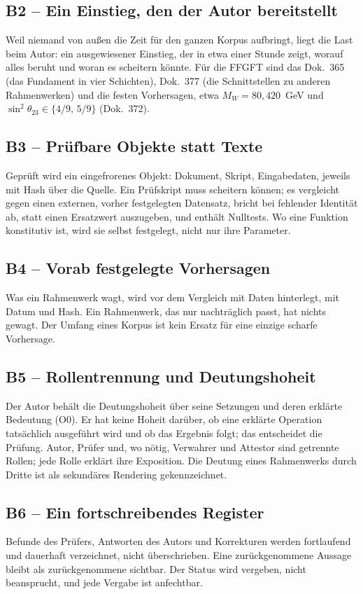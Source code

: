 \subsection*{B2 -- Ein Einstieg, den der Autor bereitstellt}
Weil niemand von außen die Zeit für den ganzen Korpus aufbringt, liegt die Last beim
Autor: ein ausgewiesener Einstieg, der in etwa einer Stunde zeigt, worauf alles beruht
und woran es scheitern könnte. Für die FFGFT sind das Dok.~365 (das Fundament in vier
Schichten), Dok.~377 (die Schnittstellen zu anderen Rahmenwerken) und die festen
Vorhersagen, etwa $M_W=80{,}420$~GeV und $\sin^2\theta_{23}\in\{4/9,\,5/9\}$ (Dok.~372).

\subsection*{B3 -- Prüfbare Objekte statt Texte}
Geprüft wird ein eingefrorenes Objekt: Dokument, Skript, Eingabedaten, jeweils mit Hash
über die Quelle. Ein Prüfskript muss scheitern können; es vergleicht gegen einen externen,
vorher festgelegten Datensatz, bricht bei fehlender Identität ab, statt einen Ersatzwert
auszugeben, und enthält Nulltests. Wo eine Funktion konstitutiv ist, wird sie selbst
festgelegt, nicht nur ihre Parameter.

\subsection*{B4 -- Vorab festgelegte Vorhersagen}
Was ein Rahmenwerk wagt, wird vor dem Vergleich mit Daten hinterlegt, mit Datum und Hash.
Ein Rahmenwerk, das nur nachträglich passt, hat nichts gewagt. Der Umfang eines Korpus
ist kein Ersatz für eine einzige scharfe Vorhersage.

\subsection*{B5 -- Rollentrennung und Deutungshoheit}
Der Autor behält die Deutungshoheit über seine Setzungen und deren erklärte Bedeutung
(O0). Er hat keine Hoheit darüber, ob eine erklärte Operation tatsächlich ausgeführt wird
und ob das Ergebnis folgt; das entscheidet die Prüfung. Autor, Prüfer und, wo nötig,
Verwahrer und Attestor sind getrennte Rollen; jede Rolle erklärt ihre Exposition. Die
Deutung eines Rahmenwerks durch Dritte ist als sekundäres Rendering gekennzeichnet.

\subsection*{B6 -- Ein fortschreibendes Register}
Befunde des Prüfers, Antworten des Autors und Korrekturen werden fortlaufend und dauerhaft
verzeichnet, nicht überschrieben. Eine zurückgenommene Aussage bleibt als zurückgenommene
sichtbar. Der Status wird vergeben, nicht beansprucht, und jede Vergabe ist anfechtbar.

